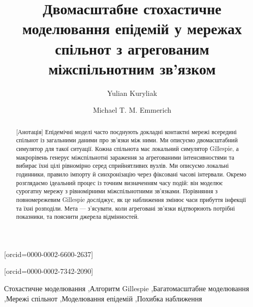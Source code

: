 \documentclass[a4paper,fleqn]{cas-sc}
\begin{document}
\let\WriteBookmarks\relax
{}

\title[mode=title]{Двомасштабне стохастичне моделювання епідемій у мережах спільнот з агрегованим міжспільнотним зв'язком}

\author[1]{Yulian Kuryliak}[orcid=0000-0002-6600-2637]
\cormark[1]

\author[2]{Michael T. M. Emmerich}[orcid=0000-0002-7342-2090]



\begin{abstract}[Анотація]
Епідемічні моделі часто поєднують докладні контактні мережі всередині спільнот із загальними даними про зв'язки між ними. Ми описуємо двомасштабний симулятор для такої ситуації. Кожна спільнота має локальний симулятор Gillespie, а макрорівень генерує міжспільнотні зараження за агрегованими інтенсивностями та вибирає їхні цілі рівномірно серед сприйнятливих вузлів. Ми описуємо локальні годинники, правило імпорту й синхронізацію через фіксовані часові інтервали. Окремо розглядаємо ідеальний процес із точним визначенням часу подій: він моделює сурогатну мережу з рівномірними міжспільнотними зв’язками. Порівняння з повномережевим Gillespie досліджує, як це наближення змінює часи прибуття інфекції та їхні розподіли. Мета --- з'ясувати, коли агреговані зв'язки відтворюють потрібні показники, та пояснити джерела відмінностей.
\end{abstract}
\begin{keywords}
Стохастичне моделювання \sep Алгоритм Gillespie \sep Багатомасштабне моделювання \sep Мережі спільнот \sep Моделювання епідемій \sep Похибка наближення
\end{keywords}
\maketitle
\end{document}
